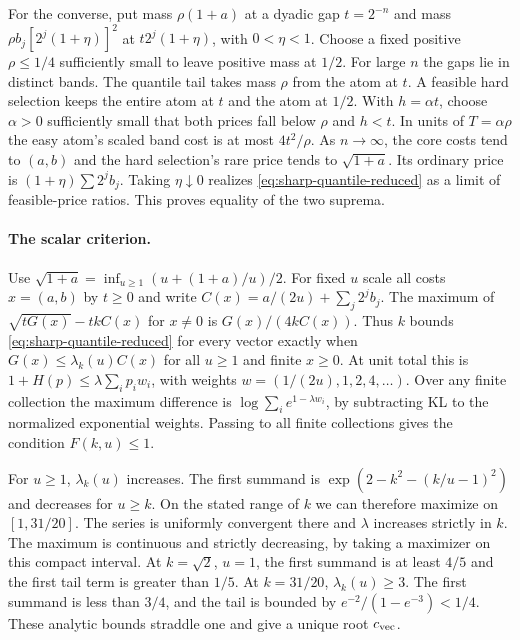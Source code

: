For the converse, put mass $\rho(1+a)$ at a dyadic gap $t=2^{-n}$
and mass $\rho b_j[2^j(1+\eta)]^2$ at $t2^j(1+\eta)$, with $0<\eta<1$.
Choose a fixed positive $\rho\le1/4$ sufficiently small to leave positive
mass at $1/2$. For large $n$ the gaps lie in distinct bands. The
quantile tail takes mass $\rho$ from the atom at $t$. A feasible hard
selection keeps the entire atom at $t$ and the atom at $1/2$. With
$h=\alpha t$, choose $\alpha>0$ sufficiently small that both prices fall
below $\rho$ and $h<t$. In units of $T=\alpha\rho$ the easy atom's
scaled band cost is at most $4t^2/\rho$. As $n\to\infty$, the core costs
tend to $(a,b)$ and the hard selection's rare price tends to
$\sqrt{1+a}$. Its ordinary price is $(1+\eta)\sum 2^j b_j$.
Taking $\eta\downarrow0$ realizes \eqref{eq:sharp-quantile-reduced} as a
limit of feasible-price ratios. This proves equality of the two suprema.

\paragraph{The scalar criterion.}
Use $\sqrt{1+a}=\inf_{u\ge1}(u+(1+a)/u)/2$. For fixed $u$ scale all
costs $x=(a,b)$ by $t\ge0$ and write $C(x)=a/(2u)+\sum_j2^j b_j$.
The maximum of $\sqrt{tG(x)}-tkC(x)$ for $x\ne0$ is $G(x)/(4kC(x))$.
Thus $k$ bounds \eqref{eq:sharp-quantile-reduced} for every vector exactly
when $G(x)\le\lambda_k(u)C(x)$ for all $u\ge1$ and finite $x\ge0$.
At unit total this is $1+H(p)\le\lambda\sum_i p_iw_i$, with weights
$w=(1/(2u),1,2,4,\ldots)$. Over any finite collection the maximum
difference is $\log\sum_i e^{1-\lambda w_i}$, by subtracting KL to the
normalized exponential weights. Passing to all finite collections gives
the condition $F(k,u)\le1$.

For $u\ge1$, $\lambda_k(u)$ increases. The first summand is
$\exp(2-k^2-(k/u-1)^2)$ and decreases for $u\ge k$. On the stated
range of $k$ we can therefore maximize on $[1,31/20]$. The series is
uniformly convergent there and $\lambda$ increases strictly in $k$.
The maximum is continuous and strictly decreasing, by taking a
maximizer on this compact interval. At $k=\sqrt2$, $u=1$, the first
summand is at least $4/5$ and the first tail term is greater than $1/5$.
At $k=31/20$, $\lambda_k(u)\ge3$. The first summand is less than $3/4$,
and the tail is bounded by $e^{-2}/(1-e^{-3})<1/4$.
These analytic bounds straddle one and give a unique root $c_{\rm vec}$.

